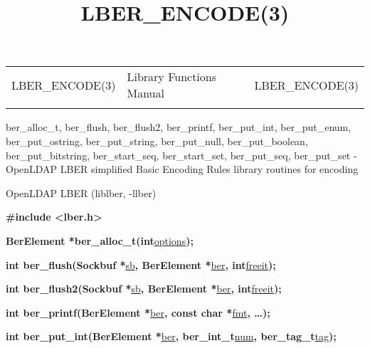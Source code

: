 \documentclass[]{article}
\title{LBER\_ENCODE(3)}
\author{}
\date{}
\let\realtextbf=\textbf
\renewcommand{\textbf}[1]{\textcolor{boldcolor}{\realtextbf{#1}}}
\renewcommand{\emph}[1]{\underline{#1}}
\begin{document}
\maketitle

\begin{longtable}[c]{@{}lll@{}}
\toprule\addlinespace
LBER\_ENCODE(3) & Library Functions Manual & LBER\_ENCODE(3)
\\\addlinespace
\bottomrule
\end{longtable}


ber\_alloc\_t, ber\_flush, ber\_flush2, ber\_printf, ber\_put\_int,
ber\_put\_enum, ber\_put\_ostring, ber\_put\_string, ber\_put\_null,
ber\_put\_boolean, ber\_put\_bitstring, ber\_start\_seq,
ber\_start\_set, ber\_put\_seq, ber\_put\_set - OpenLDAP LBER simplified
Basic Encoding Rules library routines for encoding


OpenLDAP LBER (liblber, -llber)


\textbf{\#include \textless{}lber.h\textgreater{}}

\textbf{BerElement *ber\_alloc\_t(int}\emph{options}\textbf{);}

\textbf{int ber\_flush(Sockbuf *}\emph{sb}\textbf{, BerElement
*}\emph{ber}\textbf{, int}\emph{freeit}\textbf{);}

\textbf{int ber\_flush2(Sockbuf *}\emph{sb}\textbf{, BerElement
*}\emph{ber}\textbf{, int}\emph{freeit}\textbf{);}

\textbf{int ber\_printf(BerElement *}\emph{ber}\textbf{, const char
*}\emph{fmt}\textbf{, \ldots{});}

\textbf{int ber\_put\_int(BerElement *}\emph{ber}\textbf{,
ber\_int\_t}\emph{num}\textbf{, ber\_tag\_t}\emph{tag}\textbf{);}
\end{document}
